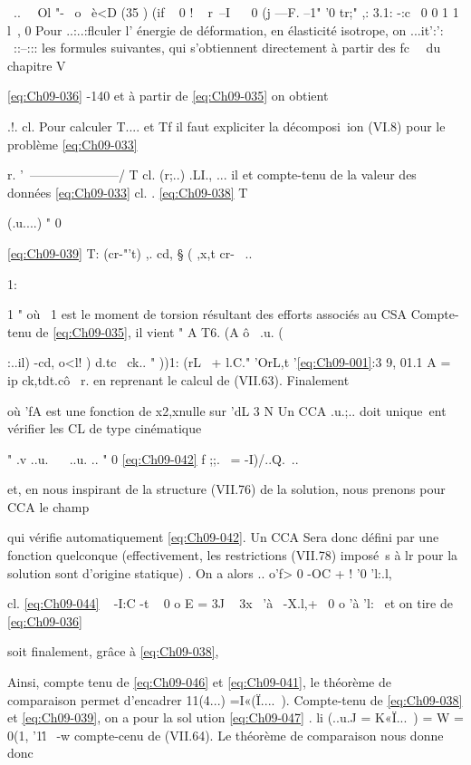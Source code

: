 ~.. ~~Ol "-~
o~ è<D
(35 ) (if ~ 0 ! ~
r~--I~ ~ 0 (j ---F. 
--1" '0 tr;" ,: 3.1:
-:c~
0 0 1 1
l~, 
0 
Pour ..:..:flculer l' énergie de déformation, en élasticité isotrope, on ...it':': ~::--::: les formules suivantes, qui s'obtiennent directement à partir des fc~~ du chapitre V 

\eqref{eq:Ch09-036} 
-140 
et à partir de \eqref{eq:Ch09-035} on obtient 

.!. cl.
Pour calculer T.... et Tf il faut expliciter la décomposi~ion (VI.8) pour le problème \eqref{eq:Ch09-033} 

r. 
'~---------------------/ 
T cl. 
(r;..)
.LI., ... il 
et compte-tenu de la valeur des données \eqref{eq:Ch09-033} 
cl. . 
\eqref{eq:Ch09-038} 
T{ (.u....) " 0 

\eqref{eq:Ch09-039} 
T: (cr-"'t) ,. cd, § ( ,x,t cr-~ .. 


1:

1 
"
où ~1 est le moment de torsion résultant des efforts associés au CSA Compte-tenu de \eqref{eq:Ch09-035}, il vient 
" 
A 
T6. (A ô~ 
.u. (}:..il) -cd, o<l! ) d.tc~ ck..
" ))1: (rL~ + l.C."
'OrL,t '\eqref{eq:Ch09-001}:3 
9, 01.1 A 
= ip ck,tdt.cô
~r. 
en reprenant le calcul de (VII.63). Finalement 

où 'fA est une fonction de x2,xnulle sur 'dL
3 
N 
Un CCA .u.;.. doit unique~ent vérifier les CL de type cinématique 

" .v 
..u.~ ~ ..u. .. " 0 
\eqref{eq:Ch09-042} f 
;;.~ = -I)/..Q.~.. 

et, en nous inspirant de la structure (VII.76) de la solution, nous prenons pour CCA le champ 

qui vérifie automatiquement \eqref{eq:Ch09-042}. Un CCA Sera donc défini par une fonction quelconque (effectivement, les restrictions (VII.78) imposé~s à lr pour la solution sont d'origine statique) . On a alors 
.. 
o'f>
0 -OC +
! 
'0 'l:.l, 

cl.
\eqref{eq:Ch09-044} ~ 
-I:C -t ~ 0 o
E = 
3J 
~ 3x~ 
'à~ 
-X.l,+~ 0 o 'à 'l:~ 
et on tire de \eqref{eq:Ch09-036} 

soit finalement, grâce à \eqref{eq:Ch09-038}, 

Ainsi, compte tenu de \eqref{eq:Ch09-046} et \eqref{eq:Ch09-041}, le théorème de comparaison permet d'encadrer 11(4...) =I«(Ï....~). Compte-tenu de \eqref{eq:Ch09-038} et \eqref{eq:Ch09-039}, on a pour la sol ution 
\eqref{eq:Ch09-047} . li (..u.J = K«Ï...~) = W = 0(1, '1l\.~ -w 
compte-cenu de (VII.64). Le théorème de comparaison nous donne donc 


